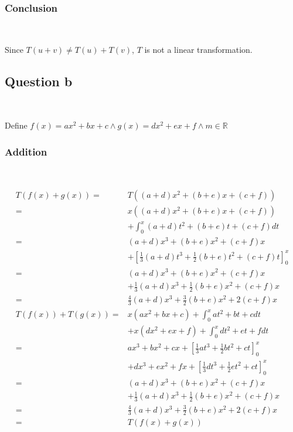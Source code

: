 \documentclass{article}
\def\R{\mathbb{R}}
\begin{document}
\subsubsection{Conclusion}

~

Since $T(u+v)\ne T(u)+T(v)$, $T$ is not a linear transformation.

\subsection{Question b}

~

Define $f(x)=ax^2+bx+c\land g(x)=dx^2+ex+f\land m\in\R$

\subsubsection{Addition}

~

\begin{equation}
\tag{3.2.1}
\begin{split}
T(f(x)+g(x))=&T((a+d)x^2+(b+e)x+(c+f))\\
=&x((a+d)x^2+(b+e)x+(c+f))\\
&+\int_{0}^{x}(a+d)t^2+(b+e)t+(c+f)dt\\
=&(a+d)x^3+(b+e)x^2+(c+f)x\\
&+\left[\frac{1}{3}(a+d)t^3+\frac{1}{2}(b+e)t^2+(c+f)t\right]_{0}^{x}\\
=&(a+d)x^3+(b+e)x^2+(c+f)x\\
&+\frac{1}{3}(a+d)x^3+\frac{1}{2}(b+e)x^2+(c+f)x\\
=&\frac{4}{3}(a+d)x^3+\frac{3}{2}(b+e)x^2+2(c+f)x\\
T(f(x))+T(g(x))=&x(ax^2+bx+c)+\int_{0}^{x}at^2+bt+cdt\\
&+x(dx^2+ex+f)+\int_{0}^{x}dt^2+et+fdt\\
=&ax^3+bx^2+cx+\left[\frac{1}{3}at^3+\frac{1}{2}bt^2+ct\right]_{0}^{x}\\
&+dx^3+ex^2+fx+\left[\frac{1}{3}dt^3+\frac{1}{2}et^2+ct\right]_{0}^{x}\\
=&(a+d)x^3+(b+e)x^2+(c+f)x\\
&+\frac{1}{3}(a+d)x^3+\frac{1}{2}(b+e)x^2+(c+f)x\\
=&\frac{4}{3}(a+d)x^3+\frac{3}{2}(b+e)x^2+2(c+f)x\\
=&T(f(x)+g(x))\\
\end{split}
\end{equation}
\end{document}
